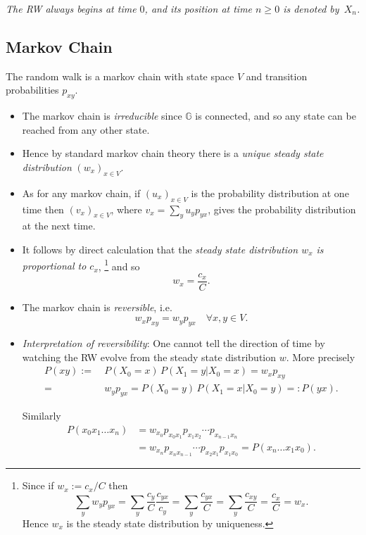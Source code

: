 \documentclass[a4paper]{amsart}
\theoremstyle{plain}
\theoremstyle{definition}
\theoremstyle{remark}
\begin{document}
\medskip \emph{The RW always begins at time $ 0 $, and its position at time $ n \geq 0 $ is denoted by~$ X_n $.}

 \subsection{Markov Chain}  The random walk is a markov chain with state space $ V   $  and transition probabilities $ p_{xy} $.
\begin{itemize}
\item The markov chain is \emph{irreducible} since $  \mathbb{G}  $ is connected, and so any state can be reached from any other state.  

\item Hence by standard markov chain theory there is a \emph{unique steady state distribution} $ (w_x)_{x\in V } $.

\item As for any markov chain, if $ (u_x)_{x\in V} $ is the probability distribution at one time then $ (v_x)_{x\in V} $, where $ v_x = \sum_y   u_y p_{yx} $, gives the probability distribution at the next time.

\item It follows by direct calculation
 that the \emph{steady state distribution $ w_x $ is proportional to $ c_ x $},%
\footnote{Since if $ w_x:= c_x/C$ then
\[
 \sum_y w_y p_{yx}  = \sum_y \frac{c_y}{C} \frac{c_{yx}}{c_y} = \sum_y\frac{c_{yx}}{C} = 
      \sum_y\frac{c_{xy}}{C} = \frac{c_x}{C} = w_x. 
\]
Hence  $ w_x $ is the steady state distribution by uniqueness.}
 and  so   
\begin{equation} \label{}
 w_x = \frac{c_x}{C}. 
\end{equation} 
      
  \item The markov chain is \emph{reversible}, i.e.
  \[ w_x p_{xy} = w_y p_{yx} \quad  \forall x,y\in V .\]
  
  \item \emph{Interpretation of reversibility}: One cannot tell the direction of time by watching the RW evolve from the steady state distribution $ w $.  More precisely
 \begin{align*}
  P(xy)  := &\  P(X_0=x) \, P(X_1=y | X_0=x)  
  = w_x p_{xy} 
  \\  = &\ w_y p_{yx}   
   =  P(X_0=y) \, P(X_1=x | X_0=y )   =: P(yx).
  \end{align*} 
  
  Similarly 
\begin{align*} 
   P(x_0x_1\dots x_n) &= w_{x_0} p_{x_0 x_1} p_{x_1 x_2} \cdots p_{x_{n-1} x_n}\\
  & = w_{x_n} p_{x_n x_{n-1}} \cdots p_{x_2 x_1} p_{x_1 x_0}
  = P(x_n  \dots x_1x_0 ) .
\end{align*} 
  

\end{itemize}
\end{document}
